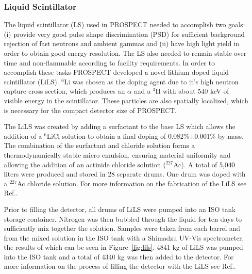 \subsubsection{Liquid Scintillator}

The liquid scintillator (LS) used in PROSPECT needed to accomplish two goals: (i) provide very good pulse shape discrimination (PSD) for sufficient background rejection of fast neutrons and ambient gammas and (ii) have high light yield in order to obtain good energy resolution. 
The LS also needed to remain stable over time and non-flammable according to facility requirements. 
In order to accomplish these tasks PROSPECT developed a novel lithium-doped liquid scintillator (LiLS). 
$^6$Li was chosen as the doping agent due to it's high neutron capture cross section, which produces an $\alpha$ and a $^3$H with about 540 keV of visible energy in the scintillator. 
These particles are also spatially localized, which is necessary for the compact detector size of PROSPECT.

The LiLS was created by adding a surfactant to the base LS which allows the addition of a $^6$LiCl solution to obtain a final doping of 0.082\%$\pm$0.001\% by mass. 
The combination of the surfactant and chloride solution forms a thermodynamically stable micro emulsion, ensuring material uniformity and allowing the addition of an actinide chloride solution ($^{227}$Ac). 
A total of 5,040 liters were produced and stored in 28 separate drums. 
One drum was doped with a $^{227}$Ac chloride solution. 
For more information on the fabrication of the LiLS see Ref.\cite{Ashenfelter:2019iqj}.

Prior to filling the detector, all drums of LiLS were pumped into an ISO tank storage container. 
Nitrogen was then bubbled through the liquid for ten days to sufficiently mix together the solution.
Samples were taken from each barrel and from the mixed solution in the ISO tank with a Shimadzu UV-Vis spectrometer, the results of which can be seen in Figure~\ref{fig:lils}.
4841 kg of LiLS was pumped into the ISO tank and a total of 4340 kg was then added to the detector. 
For more information on the process of filling the detector with the LiLS see Ref.\cite{LongNIM}.

